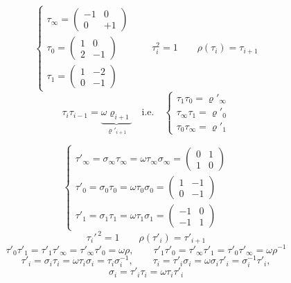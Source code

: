 \documentclass[11pt,a4paper]{article}
\begin{document}
\[
\begin{cases}
\boxed{\tau_\infty = \begin{pmatrix} -1 & 0 \\ 0 & +1 \end{pmatrix}} \\[4pt]
\tau_0 = \begin{pmatrix} 1 & 0 \\ 2 & -1 \end{pmatrix} \\[4pt]
\tau_1 = \begin{pmatrix} 1 & -2 \\ 0 & -1 \end{pmatrix}
\end{cases}
\qquad
\tau_i^2 = 1 \qquad \rho(\tau_i) = \tau_{i+1}
\]
\[
\tau_i\tau_{i-1} = \underbrace{\omega\varrho_{i+1}}_{\varrho'_{i+1}} \quad \text{i.e.} \quad
\begin{cases}
\tau_1\tau_0 = \varrho'_\infty \\
\tau_\infty\tau_1 = \varrho'_0 \\
\tau_0\tau_\infty = \varrho'_1
\end{cases}
\]

\[
\begin{cases}
\boxed{\tau'_\infty = \sigma_\infty\tau_\infty = \omega\tau_\infty\sigma_\infty = \begin{pmatrix} 0 & 1 \\ 1 & 0 \end{pmatrix}} \\[4pt]
\tau'_0 = \sigma_0\tau_0 = \omega\tau_0\sigma_0 = \begin{pmatrix} 1 & -1 \\ 0 & -1 \end{pmatrix} \\[4pt]
\tau'_1 = \sigma_1\tau_1 = \omega\tau_1\sigma_1 = \begin{pmatrix} -1 & 0 \\ -1 & 1 \end{pmatrix}
\end{cases}
\]
\[
\tau_i'^{\,2} = 1 \qquad \rho(\tau'_i) = \tau'_{i+1}
\]
\[
\tau'_0\tau'_1 = \tau'_1\tau'_\infty = \tau'_\infty\tau'_0 = \omega\rho, \qquad
\tau'_1\tau'_0 = \tau'_\infty\tau'_1 = \tau'_0\tau'_\infty = \omega\rho^{-1}
\]
\[
\tau'_i = \sigma_i\tau_i = \omega\tau_i\sigma_i = \tau_i\sigma_i^{-1}, \qquad
\tau_i = \tau'_i\sigma_i = \omega\sigma_i\tau'_i = \sigma_i^{-1}\tau'_i,
\]
\[
\sigma_i = \tau'_i\tau_i = \omega\tau_i\tau'_i
\]
\end{document}
